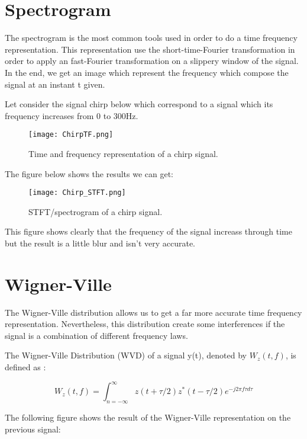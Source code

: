 
\chapter{Spectrogram}

The spectrogram is the most common tools used in order to do a time frequency representation. This representation use the short-time-Fourier transformation in order to apply an fast-Fourier transformation on a slippery window of the signal. In the end, we get an image which represent the frequency which compose the signal at an instant t given.

Let consider the signal chirp below which correspond to a signal which its frequency increases from 0 to 300Hz.

\begin{figure}[H]
\centering
    \texttt{[image: ChirpTF.png]}
    \caption{Time and frequency representation of a chirp signal.}
    \label{fig:ChirpTF}
\end{figure}

The figure below shows the results we can get:

\begin{figure}[H]
\centering
    \texttt{[image: Chirp\_STFT.png]}
    \caption{STFT/spectrogram of a chirp signal.}
    \label{fig:Chirp_STFT}
\end{figure}

This figure shows clearly that the frequency of the signal increass through time but the result is a little blur and isn't very accurate.

\chapter{Wigner-Ville}

The Wigner-Ville distribution allows us to get a far more accurate time frequency representation. Nevertheless, this distribution create some interferences if the signal is a combination of different frequency laws.

The Wigner-Ville Distribution (WVD) of a signal y(t), denoted by $W_z(t,f)$, is defined as :

\begin{equation}
W_z(t,f) = \int_{n=-\infty}^{\infty} z ( t + \tau / 2 ) z^* (t - \tau / 2) e^{-j 2 \pi f \tau d \tau}
\end{equation}

The following figure shows the result of the Wigner-Ville representation on the previous signal:


